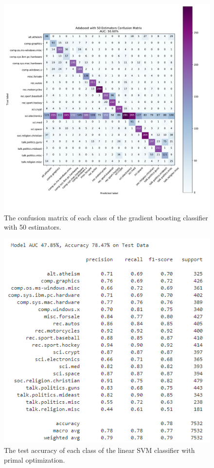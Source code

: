 \documentclass[twocolumn]{extarticle}
\begin{document}
\begin{appendices}
\begin{figure}[H]
\centering
\includegraphics[width=0.9\linewidth]{"charts/Adaboost with 50 Estimators"}
\caption{The confusion matrix of each class of the gradient boosting classifier with 50 estimators.}
\label{chart:ada-50-conf}
\end{figure}

\begin{figure}[H]
\centering
\includegraphics[width=0.9\linewidth]{charts/svm-primal-acc}
\caption{The test accuracy of each class of the linear SVM classifier with primal optimization.}
\label{chart:svm-primal-acc}
\end{figure}


\end{appendices}
\end{document}
